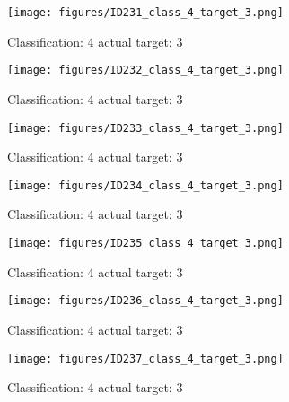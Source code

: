 \begin{figure}[h!]
\begin{center}
\texttt{[image: figures/ID231\_class\_4\_target\_3.png]}
\end{center}
\caption{ Classification: 4 actual target: 3}
\label{fig:ID231_class_4_target_3}
\end{figure}
\begin{figure}[h!]
\begin{center}
\texttt{[image: figures/ID232\_class\_4\_target\_3.png]}
\end{center}
\caption{ Classification: 4 actual target: 3}
\label{fig:ID232_class_4_target_3}
\end{figure}
\begin{figure}[h!]
\begin{center}
\texttt{[image: figures/ID233\_class\_4\_target\_3.png]}
\end{center}
\caption{ Classification: 4 actual target: 3}
\label{fig:ID233_class_4_target_3}
\end{figure}
\begin{figure}[h!]
\begin{center}
\texttt{[image: figures/ID234\_class\_4\_target\_3.png]}
\end{center}
\caption{ Classification: 4 actual target: 3}
\label{fig:ID234_class_4_target_3}
\end{figure}
\begin{figure}[h!]
\begin{center}
\texttt{[image: figures/ID235\_class\_4\_target\_3.png]}
\end{center}
\caption{ Classification: 4 actual target: 3}
\label{fig:ID235_class_4_target_3}
\end{figure}
\begin{figure}[h!]
\begin{center}
\texttt{[image: figures/ID236\_class\_4\_target\_3.png]}
\end{center}
\caption{ Classification: 4 actual target: 3}
\label{fig:ID236_class_4_target_3}
\end{figure}
\begin{figure}[h!]
\begin{center}
\texttt{[image: figures/ID237\_class\_4\_target\_3.png]}
\end{center}
\caption{ Classification: 4 actual target: 3}
\label{fig:ID237_class_4_target_3}
\end{figure}

